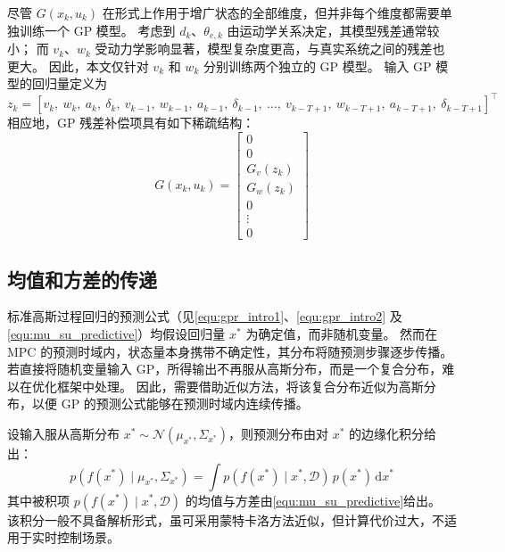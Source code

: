 尽管 $G(x_k, u_k)$ 在形式上作用于增广状态的全部维度，但并非每个维度都需要单独训练一个 GP 模型。
考虑到 $d_k$、$\theta_{e,k}$ 由运动学关系决定，其模型残差通常较小；
而 $v_k$、$w_k$ 受动力学影响显著，模型复杂度更高，与真实系统之间的残差也更大。
因此，本文仅针对 $v_k$ 和 $w_k$ 分别训练两个独立的 GP 模型。
输入 GP 模型的回归量定义为
\begin{equation} \label{equ:augmented_zk}
    z_k = [v_k,\ w_k,\ a_k,\ \delta_k,\ v_{k-1},\ w_{k-1},\ a_{k-1},\ \delta_{k-1},\ \ldots,\ 
    v_{k-T+1},\ w_{k-T+1},\ a_{k-T+1},\ \delta_{k-T+1}]^\top
\end{equation}
相应地，GP 残差补偿项具有如下稀疏结构：
\begin{equation}
    G(x_k, u_k) = \begin{bmatrix}
        0 \\ 0 \\ G_v(z_k) \\ G_w(z_k) \\ 0 \\ \vdots \\ 0
    \end{bmatrix}
\end{equation}

\subsection{均值和方差的传递}

标准高斯过程回归的预测公式（见\autoref{equ:gpr_intro1}、\autoref{equ:gpr_intro2}
及\autoref{equ:mu_su_predictive}）均假设回归量 $x^*$ 为确定值，而非随机变量。
然而在 MPC 的预测时域内，状态量本身携带不确定性，其分布将随预测步骤逐步传播。
若直接将随机变量输入 GP，所得输出不再服从高斯分布，而是一个复合分布，难以在优化框架中处理。
因此，需要借助近似方法，将该复合分布近似为高斯分布，以便 GP 的预测公式能够在预测时域内连续传播。

设输入服从高斯分布 $x^* \sim \mathcal{N}(\mu_{x^*}, \Sigma_{x^*})$，则预测分布由对 $x^*$ 的边缘化积分给出：
\begin{equation}
    p(f(x^*) \mid \mu_{x^*}, \Sigma_{x^*}) = \int p(f(x^*) \mid x^*, \mathcal{D})\, p(x^*)\, \mathrm{d}x^*
\end{equation}
其中被积项 $p(f(x^*) \mid x^*, \mathcal{D})$ 的均值与方差由\autoref{equ:mu_su_predictive}给出。
该积分一般不具备解析形式，虽可采用蒙特卡洛方法近似，但计算代价过大，不适用于实时控制场景。

